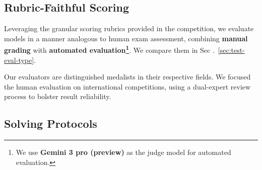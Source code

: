 \documentclass[11pt]{article}
\begin{document}
\subsection{Rubric-Faithful Scoring}
Leveraging the granular scoring rubrics provided in the competition, we evaluate models in a manner analogous to human exam assessment, combining \textbf{manual grading} with \textbf{automated evaluation\footnote{We use \textbf{Gemini 3 pro (preview)}  as the judge model for automated evaluation.}}. We compare them in Sec .~\ref {sec:test-eval-type}.

Our evaluators are distinguished medalists in their respective fields. We focused the human evaluation on international competitions, using a dual-expert review process to bolster result reliability. 


\subsection{Solving Protocols}
\end{document}
